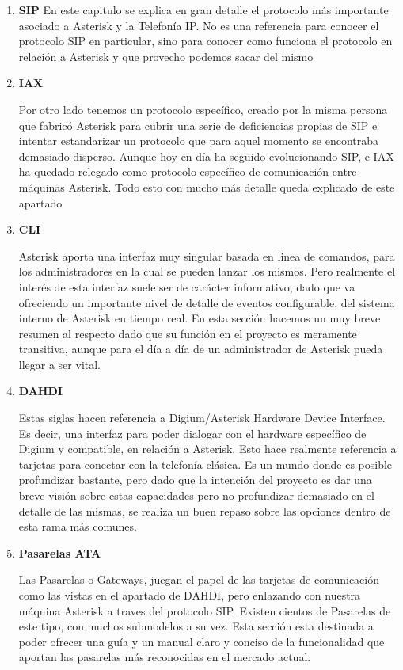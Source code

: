 \begin{enumerate}
	  \setlength{\itemsep}{10pt}

	\item \textbf{SIP}
	En este capitulo se explica en gran detalle el protocolo más importante asociado a Asterisk y la Telefonía IP. No es una referencia para conocer el protocolo SIP en particular, sino para conocer como funciona el protocolo en relación a Asterisk y que provecho podemos sacar del mismo
	
	\item \textbf{IAX}
	
	Por otro lado tenemos un protocolo específico, creado por la misma persona que fabricó Asterisk para cubrir una serie de deficiencias propias de SIP e intentar estandarizar un protocolo que para aquel momento se encontraba demasiado disperso. Aunque hoy en día ha seguido evolucionando SIP, e IAX ha quedado relegado como protocolo específico de comunicación entre máquinas Asterisk. Todo esto con mucho más  detalle queda explicado de este apartado
	
	\item \textbf{CLI}
	
	Asterisk aporta una interfaz muy singular basada en linea de comandos, para los administradores en la cual se pueden lanzar los mismos. Pero realmente el interés de esta interfaz suele ser de carácter informativo, dado que va ofreciendo un importante nivel de detalle de eventos configurable, del sistema interno de Asterisk en tiempo real. En esta sección hacemos un muy breve resumen al respecto dado que su función en el proyecto es meramente transitiva, aunque para el día a día de un administrador de Asterisk pueda llegar a ser vital.
	
	\item \textbf{DAHDI}
	
	Estas siglas hacen referencia a Digium/Asterisk Hardware Device Interface. Es decir, una interfaz para poder dialogar con el hardware específico de Digium y compatible, en relación a Asterisk. Esto hace realmente referencia a tarjetas para conectar con la telefonía clásica. Es un mundo donde es posible profundizar bastante, pero dado que la intención del proyecto es dar una breve visión sobre estas capacidades pero no profundizar demasiado en el detalle de las mismas, se realiza un buen repaso sobre las opciones dentro de esta rama más comunes.
	
  \item \textbf{Pasarelas ATA}
	
	Las Pasarelas o Gateways, juegan el papel de las tarjetas de comunicación como las vistas en el apartado de DAHDI, pero enlazando con nuestra máquina Asterisk a traves del protocolo SIP. Existen cientos de Pasarelas de este tipo, con muchos submodelos a su vez. Esta sección esta destinada a poder ofrecer una guía y un manual claro y conciso de la funcionalidad que aportan las pasarelas más reconocidas en el mercado actual.
	
\end{enumerate}

